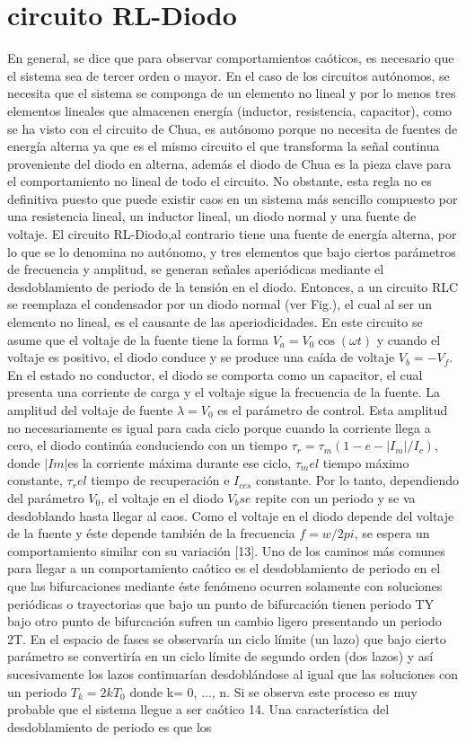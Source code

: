 \documentclass{article}
\begin{document}
\section{circuito RL-Diodo}
    En general, se dice que para observar comportamientos caóticos, es necesario que el sistema sea de tercer orden o mayor. En el caso de los circuitos autónomos, se necesita que el sistema se componga de un elemento no lineal y por lo menos tres elementos lineales que almacenen energía (inductor, resistencia, capacitor), como se ha visto con el circuito de Chua, es autónomo porque no necesita de fuentes de energía alterna ya que es el mismo circuito el que transforma la señal continua proveniente del diodo en alterna, además el diodo de Chua es la pieza clave para el comportamiento no lineal de todo el circuito. No obstante, esta regla no es deﬁnitiva puesto que puede existir caos en un sistema más sencillo compuesto por una resistencia lineal, un inductor lineal, un diodo normal y una fuente de voltaje. El circuito RL-Diodo,al contrario tiene una fuente de energía alterna, por lo que se lo denomina no autónomo, y tres elementos que bajo ciertos parámetros de frecuencia y amplitud, se generan señales aperiódicas mediante el desdoblamiento de periodo de la tensión en el diodo. Entonces, a un circuito RLC se reemplaza el condensador por un diodo normal (ver Fig.), el cual al ser un elemento no lineal, es el causante de las aperiodicidades. En este circuito se asume que el voltaje de la fuente tiene la forma $V_a = V_0\cos(\omega t)$ y cuando el voltaje es positivo, el diodo conduce y se produce una caída de voltaje $V_b = −V_f$. En el estado no conductor, el diodo se comporta como un capacitor, el cual presenta una corriente de carga y el voltaje sigue la frecuencia de la fuente. La amplitud del voltaje de fuente $\lambda=V_0$ es el parámetro de control. Esta amplitud no necesariamente es igual para cada ciclo porque cuando la corriente llega a cero, el diodo continúa conduciendo con un tiempo $\tau_r=\tau_{m}(1−e−|I_m|/I_c)$, donde $|Im|$es la corriente máxima durante ese ciclo, $\tau_mel$ tiempo máximo constante, $\tau_rel$ tiempo de recuperación e $I_{ces}$ constante. Por lo tanto, dependiendo del parámetro $V_0$, el voltaje en el diodo $V_bse$ repite con un periodo y se va desdoblando hasta llegar al caos. Como el voltaje en el diodo depende del voltaje de la fuente y éste depende también de la frecuencia $f=w/2pi$, se espera un comportamiento similar con su variación [13]. Uno de los caminos más comunes para llegar a un comportamiento caótico es el desdoblamiento de periodo en el que las bifurcaciones mediante éste fenómeno ocurren solamente con soluciones periódicas o trayectorias que bajo un punto de bifurcación tienen periodo TY bajo otro punto de bifurcación sufren un cambio ligero presentando un periodo 2T. En el espacio de fases se observaría un ciclo límite (un lazo) que bajo cierto parámetro se convertiría en un ciclo límite de segundo orden (dos lazos) y así sucesivamente los lazos continuarían desdoblándose al igual que las soluciones con un periodo $T_k = 2kT_0$ donde k= 0, ..., n. Si se observa este proceso es muy probable que el sistema llegue a ser caótico 14. Una característica del desdoblamiento de periodo es que los 
\end{document}
